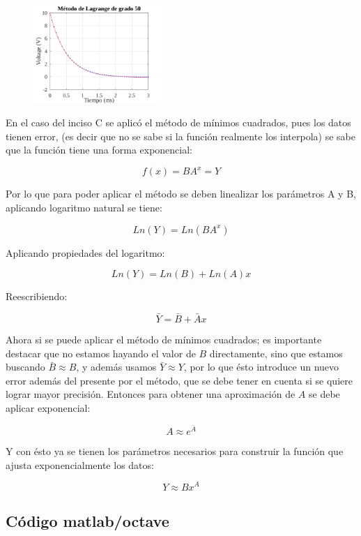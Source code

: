 \documentclass[letterpaper, 10 pt, conference]{ieeeconf}  %
\begin{document}
    \begin{figure}[H]
    \centering
    \includegraphics[width=0.43\textwidth]{./../plots/ej1/ej1-b.png}
    \label{fig:fig}
    \end{figure}

    En el caso del inciso C se aplic\'o el m\'etodo de m\'inimos cuadrados, pues los datos tienen error, (es decir que no se sabe si la funci\'on realmente los interpola) se sabe que la funci\'on tiene una forma exponencial:

    \[ f(x) = BA^x = Y \] 

    Por lo que para poder aplicar el m\'etodo se deben linealizar los par\'ametros A y B, aplicando logaritmo natural se tiene: 

    \[  Ln(Y) = Ln(BA^x) \] 

    Aplicando propiedades del logaritmo:

    \[ Ln(Y) = Ln(B) + Ln(A)x \]

    Reescribiendo:

    \[ \bar{Y} = \bar{B} + \bar{A}x \]

    Ahora si se puede aplicar el m\'etodo de m\'inimos cuadrados; es importante destacar que no estamos hayando el valor de $B$ directamente, sino que estamos buscando $\bar{B} \approx B$, y adem\'as usamos $\bar{Y} \approx Y$, por lo que \'esto introduce un nuevo error adem\'as del presente por el m\'etodo, que se debe tener en cuenta si se quiere lograr mayor precisi\'on.
    Entonces para obtener una aproximaci\'on de $A$ se debe aplicar exponencial:

    \[ A \approx e^{\bar{A}} \]

    Y con \'esto ya se tienen los par\'ametros necesarios para construir la funci\'on que ajusta exponencialmente los datos:

    \[ Y \approx Bx^{A} \]

    \subsection{C\'odigo matlab/octave}
\end{document}
